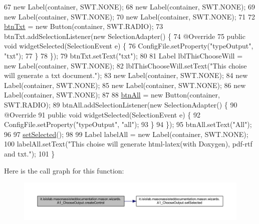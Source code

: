 \begin{DoxyCode}
67         \textcolor{keyword}{new} Label(container, SWT.NONE);
68         \textcolor{keyword}{new} Label(container, SWT.NONE);
69         \textcolor{keyword}{new} Label(container, SWT.NONE);
70         \textcolor{keyword}{new} Label(container, SWT.NONE);
71         
72         \hyperlink{classit_1_1isislab_1_1masonassisteddocumentation_1_1mason_1_1wizards_1_1_a1___choose_output_a7a3e59d93bfba5d422c70ffdaf34f8ae}{btnTxt} = \textcolor{keyword}{new} Button(container, SWT.RADIO);
73         btnTxt.addSelectionListener(\textcolor{keyword}{new} SelectionAdapter() \{
74             @Override
75             \textcolor{keyword}{public} \textcolor{keywordtype}{void} widgetSelected(SelectionEvent e) \{
76                 ConfigFile.setProperty(\textcolor{stringliteral}{"typeOutput"}, \textcolor{stringliteral}{"txt"});
77             \}
78         \});
79         btnTxt.setText(\textcolor{stringliteral}{"txt"});
80         
81         Label lblThisChooseWill = \textcolor{keyword}{new} Label(container, SWT.NONE);
82         lblThisChooseWill.setText(\textcolor{stringliteral}{"This choise will generate a txt document."});
83         \textcolor{keyword}{new} Label(container, SWT.NONE);
84         \textcolor{keyword}{new} Label(container, SWT.NONE);
85         \textcolor{keyword}{new} Label(container, SWT.NONE);
86         \textcolor{keyword}{new} Label(container, SWT.NONE);
87         
88         \hyperlink{classit_1_1isislab_1_1masonassisteddocumentation_1_1mason_1_1wizards_1_1_a1___choose_output_aebfe811a15807a6648df6d7cb9ce1196}{btnAll} = \textcolor{keyword}{new} Button(container, SWT.RADIO);
89         btnAll.addSelectionListener(\textcolor{keyword}{new} SelectionAdapter() \{
90             @Override
91             \textcolor{keyword}{public} \textcolor{keywordtype}{void} widgetSelected(SelectionEvent e) \{
92                 ConfigFile.setProperty(\textcolor{stringliteral}{"typeOutput"}, \textcolor{stringliteral}{"all"});
93             \}
94         \});
95         btnAll.setText(\textcolor{stringliteral}{"All"});
96         
97         \hyperlink{classit_1_1isislab_1_1masonassisteddocumentation_1_1mason_1_1wizards_1_1_a1___choose_output_a4602f301eef9ed9fbb73ef78b00ae401}{setSelected}();
98         
99         Label labelAll = \textcolor{keyword}{new} Label(container, SWT.NONE);
100         labelAll.setText(\textcolor{stringliteral}{"This choise will generate html-latex(with Doxygen), pdf-rtf and txt."});
101     \}
\end{DoxyCode}


Here is the call graph for this function\-:\nopagebreak
\begin{figure}[H]
\begin{center}
\leavevmode
\includegraphics[width=350pt]{classit_1_1isislab_1_1masonassisteddocumentation_1_1mason_1_1wizards_1_1_a1___choose_output_a9f06e01c71cae4b98c300170ab2515a5_cgraph}
\end{center}
\end{figure}


